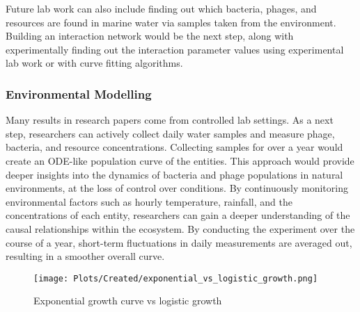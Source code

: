 Future lab work can also include finding out which bacteria, phages, and resources are found in marine water via samples taken from the environment. 
Building an interaction network would be the next step, along with experimentally finding out the interaction parameter values using experimental lab work or with curve fitting algorithms. 

\subsubsection{Environmental Modelling}
Many results in research papers come from controlled lab settings. 
As a next step, researchers can actively collect daily water samples and measure phage, bacteria, and resource concentrations. 
Collecting samples for over a year would create an ODE-like population curve of the entities. 
This approach would provide deeper insights into the dynamics of bacteria and phage populations in natural environments, at the loss of control over conditions. 
By continuously monitoring environmental factors such as hourly temperature, rainfall, and the concentrations of each entity, researchers can gain a deeper understanding of the causal relationships within the ecosystem.
By conducting the experiment over the course of a year, short-term fluctuations in daily measurements are averaged out, resulting in a smoother overall curve.


\begin{figure}
    \centering
    \texttt{[image: Plots/Created/exponential\_vs\_logistic\_growth.png]}
    \caption{Exponential growth curve vs logistic growth}
    \label{fig:created:exponential_vs_logistic_growth}
\end{figure}